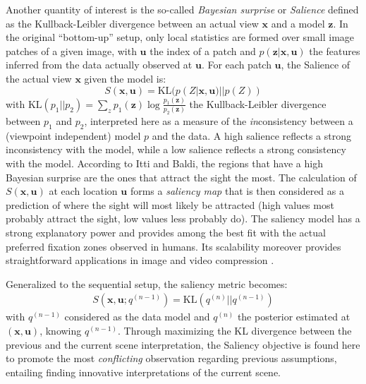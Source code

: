 \documentclass[12pt,twoside,openright]{article}
\begin{document}
Another quantity of interest is the so-called \emph{Bayesian surprise} or \emph{Salience} \citep{itti2005bayesian} defined as the Kullback-Leibler divergence  between an actual view $\boldsymbol{x}$ and a model $\boldsymbol{z}$. In the original ``bottom-up'' setup, only local statistics are formed over small image patches of a given image, with $\boldsymbol{u}$ the index of a patch and $p(\boldsymbol{z}|\boldsymbol{x},\boldsymbol{u})$ the features inferred from the data actually observed at $\boldsymbol{u}$. For each patch $\boldsymbol{u}$, the Salience of the actual view $\boldsymbol{x}$ given the model is:
$$ S(\boldsymbol{x},\boldsymbol{u}) = \text{KL}(p(Z| \boldsymbol{x}, \boldsymbol{u})||p(Z))$$
{\color{Purple} with $\text{KL}(p_1||p_2) = \sum_z p_1(\boldsymbol{z}) \log \frac{p_1(\boldsymbol{z})}{p_2(\boldsymbol{z})}$ the Kullback-Leibler divergence between $p_1$ and $p_2$, interpreted here as} a measure of the \emph{in}consistency between a (viewpoint independent)  model $p$ and the data. A high salience reflects a strong inconsistency with the model, while a low salience reflects a strong consistency with the model. According to Itti and Baldi, the regions that have a high Bayesian surprise are the ones that attract the sight the most. The calculation of $S(\boldsymbol{x}, \boldsymbol{u})$ at each location $\boldsymbol{u}$ forms a \emph{saliency map} that is then considered as a prediction of where the sight will most likely be attracted (high values most probably attract the sight, low values less probably do). The saliency model has a strong explanatory power and provides among the best fit with the actual preferred fixation zones observed in humans.
Its scalability moreover provides straightforward applications in image and video compression  \citep{wang2003foveation,guo2010novel}.

Generalized to the sequential setup, the saliency metric becomes:
\begin{align} S(\boldsymbol{x},\boldsymbol{u}; q^{(n-1)}) = \text{KL}(q^{(n)}||q^{(n-1)})\label{eq:saliency}
\end{align}
with $q^{(n-1)}$ considered as the data model and $q^{(n)}$ the posterior estimated at $(\boldsymbol{x},\boldsymbol{u})$, {\color{Purple} knowing $q^{(n-1)}$}. 
{\color{Purple} Through maximizing the KL divergence between the previous and the current scene interpretation, the Saliency objective is found here to promote the most \emph{conflicting} observation regarding previous assumptions, entailing finding innovative interpretations of the current scene.}  
\end{document}
